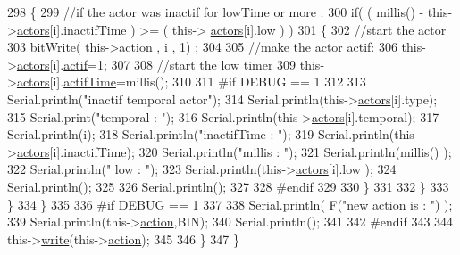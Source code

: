 \begin{DoxyCode}
298                 \{
299                     \textcolor{comment}{//if the actor was inactif for lowTime or more :}
300                     \textcolor{keywordflow}{if}( ( millis() - this->\hyperlink{classJetpack_a7e16d2f97837f9712a2e6de1c50d99db}{actors}[i].inactifTime ) >= ( this->
      \hyperlink{classJetpack_a7e16d2f97837f9712a2e6de1c50d99db}{actors}[i].low  ) )
301                     \{
302                         \textcolor{comment}{//start the actor}
303                         bitWrite( this->\hyperlink{classJetpack_aca3142925a7b0834b34ae91d26af7765}{action} , i , 1) ;
304 
305                         \textcolor{comment}{//make the actor actif:}
306                         this->\hyperlink{classJetpack_a7e16d2f97837f9712a2e6de1c50d99db}{actors}[i].\hyperlink{structJetpack_1_1state_aa177541689bbaea21a4650a083b0df77}{actif}=1;
307 
308                         \textcolor{comment}{//start the low timer}
309                         this->\hyperlink{classJetpack_a7e16d2f97837f9712a2e6de1c50d99db}{actors}[i].\hyperlink{structJetpack_1_1state_af2e1cc323ef9ffcc3cf4d203f85d726b}{actifTime}=millis();
310 
311 \textcolor{preprocessor}{                    #if DEBUG == 1 }
312                         
313                         Serial.println(\textcolor{stringliteral}{"inactif temporal actor"});
314                         Serial.println(this->\hyperlink{classJetpack_a7e16d2f97837f9712a2e6de1c50d99db}{actors}[i].type);
315                         Serial.print(\textcolor{stringliteral}{"temporal : "});
316                         Serial.println(this->\hyperlink{classJetpack_a7e16d2f97837f9712a2e6de1c50d99db}{actors}[i].temporal);
317                         Serial.println(i);
318                         Serial.println(\textcolor{stringliteral}{"inactifTime : "});
319                         Serial.println(this->\hyperlink{classJetpack_a7e16d2f97837f9712a2e6de1c50d99db}{actors}[i].inactifTime);
320                         Serial.println(\textcolor{stringliteral}{"millis : "});
321                         Serial.println(millis() );
322                         Serial.println(\textcolor{stringliteral}{" low : "});
323                         Serial.println(this->\hyperlink{classJetpack_a7e16d2f97837f9712a2e6de1c50d99db}{actors}[i].low );
324                         Serial.println();
325 
326                         Serial.println();
327                     
328 \textcolor{preprocessor}{                    #endif}
329                 
330                     \}           
331             
332                 \}
333             \}
334         \}
335     
336 \textcolor{preprocessor}{    #if DEBUG == 1 }
337 
338         Serial.println( F(\textcolor{stringliteral}{"new action is : "}) );
339         Serial.println(this->\hyperlink{classJetpack_aca3142925a7b0834b34ae91d26af7765}{action},BIN);
340         Serial.println();
341     
342 \textcolor{preprocessor}{    #endif }
343 
344         this->\hyperlink{classJetpack_a338f1af8cbc6504ac69b47c7328569b5}{write}(this->\hyperlink{classJetpack_aca3142925a7b0834b34ae91d26af7765}{action});
345 
346     \} 
347 \}
\end{DoxyCode}
